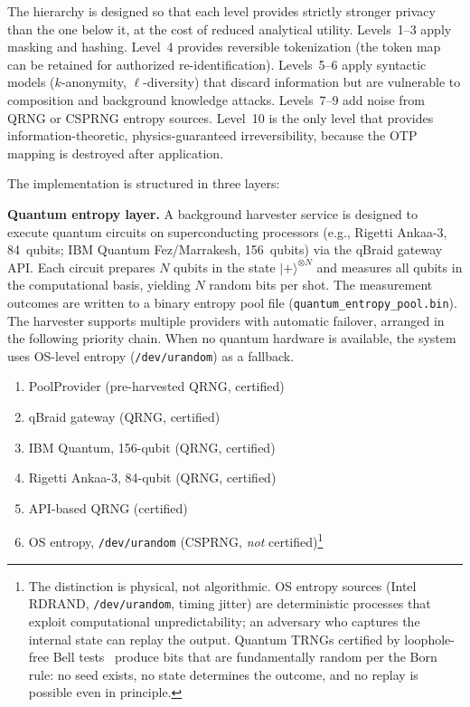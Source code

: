 \documentclass[journal]{IEEEtran}
\begin{document}
The hierarchy is designed so that each level provides strictly stronger privacy than the one below it, at the cost of reduced analytical utility. Levels~1--3 apply masking and hashing. Level~4 provides reversible tokenization (the token map can be retained for authorized re-identification). Levels~5--6 apply syntactic models ($k$-anonymity, $\ell$-diversity) that discard information but are vulnerable to composition and background knowledge attacks. Levels~7--9 add noise from QRNG or CSPRNG entropy sources. Level~10 is the only level that provides information-theoretic, physics-guaranteed irreversibility, because the OTP mapping is destroyed after application.

The implementation is structured in three layers:

\textbf{Quantum entropy layer.} A background harvester service is designed to execute quantum circuits on superconducting processors (e.g., Rigetti Ankaa-3, 84~qubits; IBM Quantum Fez/Marrakesh, 156~qubits) via the qBraid gateway API. Each circuit prepares $N$ qubits in the state $|{+}\rangle^{\otimes N}$ and measures all qubits in the computational basis, yielding $N$ random bits per shot. The measurement outcomes are written to a binary entropy pool file (\texttt{quantum\_entropy\_pool.bin}). The harvester supports multiple providers with automatic failover, arranged in the following priority chain. When no quantum hardware is available, the system uses OS-level entropy (\texttt{/dev/urandom}) as a fallback.
\begin{enumerate}
\item PoolProvider (pre-harvested QRNG, certified)
\item qBraid gateway (QRNG, certified)
\item IBM Quantum, 156-qubit (QRNG, certified)
\item Rigetti Ankaa-3, 84-qubit (QRNG, certified)
\item API-based QRNG (certified)
\item OS entropy, \texttt{/dev/urandom} (CSPRNG, \emph{not} certified)\footnote{The distinction is physical, not algorithmic. OS entropy sources (Intel RDRAND, \texttt{/dev/urandom}, timing jitter) are deterministic processes that exploit computational unpredictability; an adversary who captures the internal state can replay the output. Quantum TRNGs certified by loophole-free Bell tests~\cite{hensen2015loophole} produce bits that are fundamentally random per the Born rule: no seed exists, no state determines the outcome, and no replay is possible even in principle.}
\end{enumerate}
\end{document}
